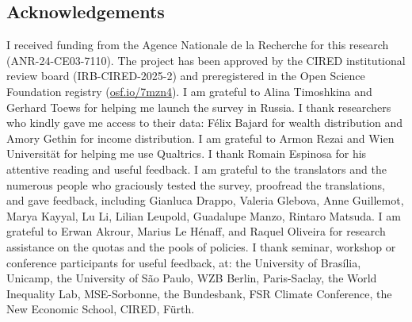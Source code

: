 \documentclass[12pt,english]{article}
\begin{document}
\begin{bibunit}[unsrtnat] %

\clearpage %
\section*{\normalsize Acknowledgements}
\iffalse %
I received funding from the Agence Nationale de la Recherche for this research (ANR-24-CE03-7110). %
The project has been approved by the CIRED institutional review board (IRB-CIRED-2025-2) and %
preregistered in the Open Science Foundation registry (\href{https://osf.io/7mzn4}{osf.io/7mzn4}). 
I am grateful to Alina Timoshkina and Gerhard Toews for helping me launch the survey in Russia. I thank researchers who kindly gave me access to their data: Félix Bajard for wealth distribution and Amory Gethin for income distribution. %
I am grateful to Armon Rezai and Wien Universität for helping me use Qualtrics. I thank Romain Espinosa for his attentive reading and useful feedback. I am grateful to the translators and the numerous people who graciously tested the survey, proofread the translations, and gave feedback, including Gianluca Drappo, Valeria Glebova, Anne Guillemot, Marya Kayyal, Lu Li, Lilian Leupold, Guadalupe Manzo, Rintaro Matsuda. %
I am grateful to Erwan Akrour, Marius Le Hénaff, and Raquel Oliveira %
for research assistance on the quotas and the pools of policies. I thank seminar, workshop or conference participants for useful feedback, at: the University of Brasília, Unicamp, the University of São Paulo, WZB Berlin, Paris-Saclay, the World Inequality Lab, MSE-Sorbonne, the Bundesbank, FSR Climate Conference, the New Economic School, CIRED, Fürth. 


\end{bibunit}
\end{document}
